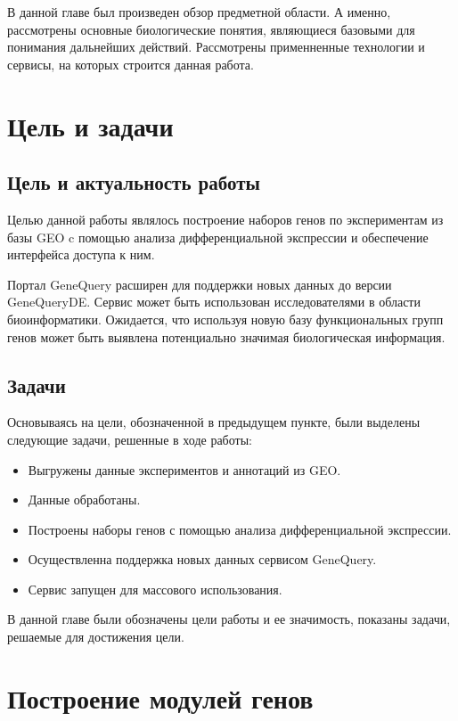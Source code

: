 \documentclass[times,specification,annotation]{itmo-student-thesis}
\begin{document}
\chapterconclusion

В данной главе был произведен обзор предметной области. А именно, рассмотрены основные биологические понятия, являющиеся базовыми для понимания дальнейших действий. Рассмотрены применненные технологии и сервисы, на которых строится данная работа. 
\finishrelatedwork

\chapter{Цель и задачи}

\section{Цель и актуальность работы}

Целью данной работы являлось построение наборов генов по экспериментам из базы GEO c помощью анализа дифференциальной экспрессии и обеспечение интерфейса доступа к ним. 

Портал GeneQuery расширен для поддержки новых данных до версии GeneQueryDE. Сервис может быть использован исследователями в области биоинформатики. Ожидается, что используя новую базу функциональных групп генов может быть выявлена потенциально значимая биологическая информация. 

\section{Задачи}

Основываясь на цели, обозначенной в предыдущем пункте, были выделены следующие задачи, решенные в ходе работы:
\begin{itemize}
    \item Выгружены данные экспериментов и аннотаций из GEO.
    \item Данные обработаны.
    \item Построены наборы генов с помощью анализа дифференциальной экспрессии.
    \item Осуществленна поддержка новых данных сервисом GeneQuery.
    \item Сервис запущен для массового использования.
\end{itemize}

\chapterconclusion

В данной главе были обозначены цели работы и ее значимость, показаны задачи, решаемые для достижения цели. 

\chapter{Построение модулей генов}
\end{document}
